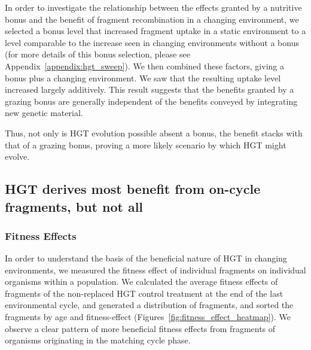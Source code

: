 \documentclass[PhD]{msu-thesis}
\begin{document}
In order to investigate the relationship between the effects granted by a nutritive bonus and the benefit of fragment recombination in a changing environment, we selected a bonus level that increased fragment uptake in a static environment to a level comparable to the increase seen in changing environments without a bonus (for more details of this bonus selection, please see Appendix~\ref{appendix:hgt_sweep}). We then combined these factors, giving a bonus plus a changing environment. We saw that the resulting uptake level increased largely additively. This result suggests that the benefits granted by a grazing bonus are generally independent of the benefits conveyed by integrating new genetic material. 

Thus, not only is HGT evolution possible absent a bonus, the benefit stacks with that of a grazing bonus, proving a more likely scenario by which HGT might evolve. %


\subsection{HGT derives most benefit from on-cycle fragments, but not all}

\subsubsection{Fitness Effects}
In order to understand the basis of the beneficial nature of HGT in changing environments, we measured the fitness effect of individual fragments on individual organisms within a population.
We calculated the average fitness effects of fragments of the non-replaced HGT control treatment at the end of the last environmental cycle, and generated a distribution of fragments, and sorted the fragments by age and fitness-effect (Figures~\ref{fig:fitness_effect_heatmap}). We observe a clear pattern of more beneficial fitness effects from fragments of organisms originating in the matching cycle phase. 
\end{document}

